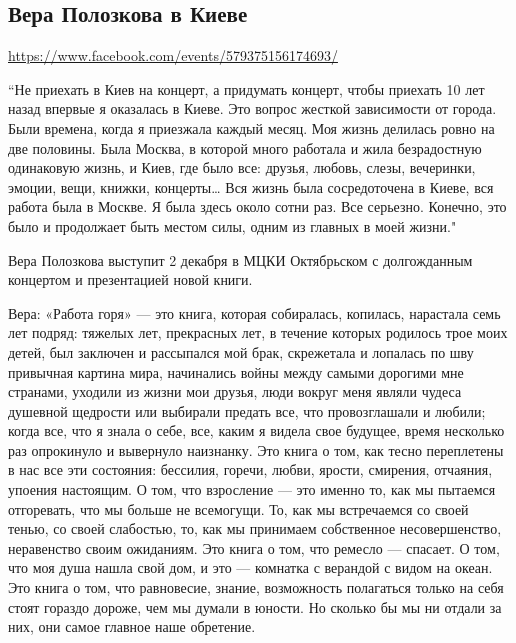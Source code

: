  
 

\subsection{Вера Полозкова в Киеве}

\url{https://www.facebook.com/events/579375156174693/}

“Не приехать в Киев на концерт, а придумать концерт, чтобы приехать 10 лет
назад впервые я оказалась в Киеве. Это вопрос жесткой зависимости от города.
Были времена, когда я приезжала каждый месяц. Моя жизнь делилась ровно на две
половины. Была Москва, в которой много работала и жила безрадостную одинаковую
жизнь, и Киев, где было все: друзья, любовь, слезы, вечеринки, эмоции, вещи,
книжки, концерты… Вся жизнь была сосредоточена в Киеве, вся работа была в
Москве. Я была здесь около сотни раз. Все серьезно. Конечно, это было и
продолжает быть местом силы, одним из главных в моей жизни."

Вера Полозкова выступит 2 декабря в МЦКИ Октябрьском с долгожданным концертом и презентацией новой книги.

Вера: «Работа горя» — это книга, которая собиралась, копилась, нарастала семь
лет подряд: тяжелых лет, прекрасных лет, в течение которых родилось трое моих
детей, был заключен и рассыпался мой брак, скрежетала и лопалась по шву
привычная картина мира, начинались войны между самыми дорогими мне странами,
уходили из жизни мои друзья, люди вокруг меня являли чудеса душевной щедрости
или выбирали предать все, что провозглашали и любили; когда все, что я знала о
себе, все, каким я видела свое будущее, время несколько раз опрокинуло и
вывернуло наизнанку. Это книга о том, как тесно переплетены в нас все эти
состояния: бессилия, горечи, любви, ярости, смирения, отчаяния, упоения
настоящим. О том, что взросление — это именно то, как мы пытаемся отгоревать,
что мы больше не всемогущи. То, как мы встречаемся со своей тенью, со своей
слабостью, то, как мы принимаем собственное несовершенство, неравенство своим
ожиданиям. Это книга о том, что ремесло — спасает. О том, что моя душа нашла
свой дом, и это — комнатка с верандой с видом на океан. Это книга о том, что
равновесие, знание, возможность полагаться только на себя стоят гораздо дороже,
чем мы думали в юности. Но сколько бы мы ни отдали за них, они самое главное
наше обретение.
